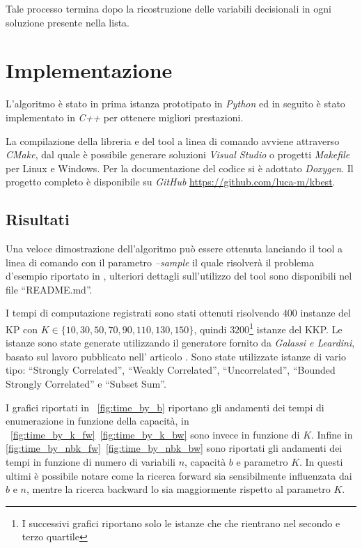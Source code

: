 \documentclass{llncs}
\newcommand{\labelsec}[1]{\label{sec:#1}}
\newcommand{\labelssec}[1]{\label{ssec:#1}}
\begin{document}
Tale processo termina dopo la ricostruzione delle variabili decisionali in ogni soluzione presente nella lista. 


\section{Implementazione}
\labelsec{implementazione}

L'algoritmo è stato in prima istanza prototipato in \emph{Python} ed in seguito è stato implementato in \emph{C++} per ottenere migliori prestazioni.

La compilazione della libreria e del tool a linea di comando avviene attraverso \emph{CMake}, dal quale è possibile generare soluzioni \emph{Visual Studio} o progetti \emph{Makefile} per Linux e Windows. Per la documentazione del codice si è adottato \emph{Doxygen}. Il progetto completo è disponibile su \emph{GitHub} \url{https://github.com/luca-m/kbest}.

\subsection{Risultati}
\labelssec{risultati}

Una veloce dimostrazione dell'algoritmo può essere ottenuta lanciando il tool a linea di comando con il parametro \emph{--sample} il quale risolverà il problema d'esempio riportato in \cite{YANASSE2000}, ulteriori dettagli sull'utilizzo del tool sono disponibili nel file ``README.md''.

I tempi di computazione registrati sono stati ottenuti risolvendo $400$ instanze del KP con $K \in \{ 10,30,50,70,90,110,130,150 \}$, quindi $3200$\footnote{I successivi grafici riportano solo le istanze che che rientrano nel secondo e terzo quartile} istanze del KKP. Le istanze sono state generate utilizzando il generatore fornito da \emph{Galassi e Leardini}, basato sul lavoro pubblicato nell' articolo \cite{Pisinger94}. Sono state utilizzate istanze di vario tipo: ``Strongly Correlated'', ``Weakly Correlated'', ``Uncorrelated'', ``Bounded Strongly Correlated'' e ``Subset Sum''. 

I grafici riportati in ~\ref{fig:time_by_b} riportano gli andamenti dei tempi di enumerazione in funzione della capacità, in ~\ref{fig:time_by_k_fw}~\ref{fig:time_by_k_bw} sono invece in funzione di $K$. Infine in \ref{fig:time_by_nbk_fw}~\ref{fig:time_by_nbk_bw} sono riportati gli andamenti dei tempi in funzione di numero di variabili $n$, capacità $b$ e parametro $K$. In questi ultimi è possibile notare come la ricerca forward sia sensibilmente influenzata dai $b$ e $n$, mentre la ricerca backward lo sia maggiormente rispetto al parametro $K$.
\end{document}
